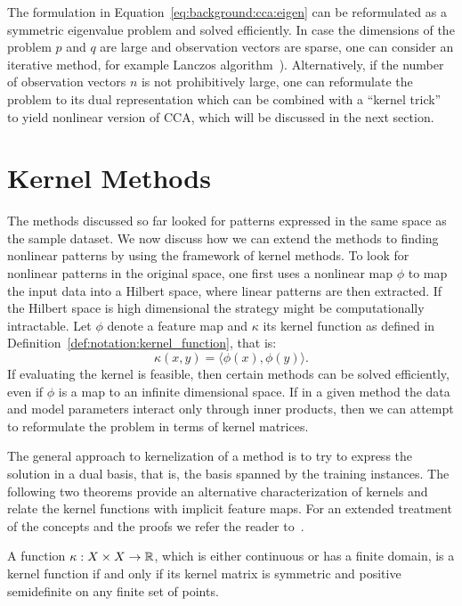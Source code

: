 The formulation in Equation~\ref{eq:background:cca:eigen} can be reformulated as a symmetric eigenvalue
problem and solved efficiently. In case the dimensions of the problem $p$ and $q$ are large and
observation vectors are sparse, one can consider an iterative method, for example Lanczos
algorithm~\cite{LAL}). Alternatively, if the number of observation vectors $n$ is not prohibitively
large, one can reformulate the problem to its dual representation which can be combined with a ``kernel trick''~\cite{FBMJ}
to yield nonlinear version of CCA, which will be discussed in the next section.

\section{Kernel Methods}\label{chap:background:kernels}
The methods discussed so far looked for patterns expressed in the same space as the sample dataset. We now discuss how we can extend the methods to finding nonlinear patterns by using the framework of kernel methods.
To look for nonlinear patterns in the original space, one first uses a nonlinear map $\phi$ to map the input data into a Hilbert space, where linear patterns are then extracted. If the Hilbert space is high dimensional the strategy might be computationally intractable.
Let $\phi$ denote a feature map and $\kappa$ its kernel function as defined in Definition~\ref{def:notation:kernel_function}, that is:
$$ \kappa(x,y) = \langle \phi(x), \phi(y) \rangle.$$
If evaluating the kernel is feasible, then certain methods can be solved efficiently, even
if $\phi$ is a map to an infinite dimensional space. If in a given method the data and model parameters interact only through inner products, then
we can attempt to reformulate the problem in terms of kernel matrices.

The general approach to kernelization of a method is to try to express the solution in a dual basis, that is, the basis spanned by the training instances.
The following two theorems provide an alternative characterization of kernels and relate the kernel functions with implicit feature maps. For an extended
treatment of the concepts and the proofs we refer the reader to~\cite{shawe-taylor04kernel}.

\begin{theorem}\label{thm:background:kernel_function}
A function $\kappa: X \times X \rightarrow \mathbb{R}$, which is either continuous or has a finite domain,
is a kernel function if and only if its kernel matrix is symmetric and positive semidefinite on any finite set of points.
\end{theorem}

